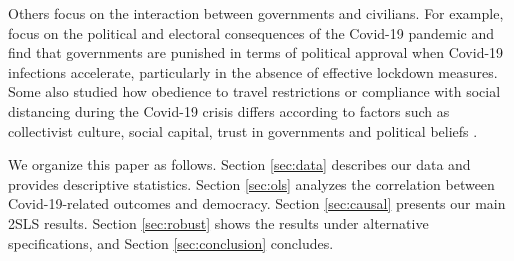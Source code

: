 Others focus on the interaction between governments and civilians. For example, \textcite{politics-survey} focus on the political and electoral consequences of the Covid-19 pandemic and find that governments are punished in terms of political approval when Covid-19 infections accelerate, particularly in the absence of effective lockdown measures. Some also studied how obedience to travel restrictions or compliance with social distancing during the Covid-19 crisis differs according to factors such as collectivist culture, social capital, trust in governments and political beliefs \parencite{frey, social-distancing, social-capital, covid-communication}. 

We organize this paper as follows. Section \ref{sec:data} describes our data and provides descriptive statistics.  Section \ref{sec:ols} analyzes the correlation between Covid-19-related outcomes and democracy. Section \ref{sec:causal} presents our main 2SLS results. Section \ref{sec:robust} shows the results under alternative specifications, and Section \ref{sec:conclusion} concludes. 